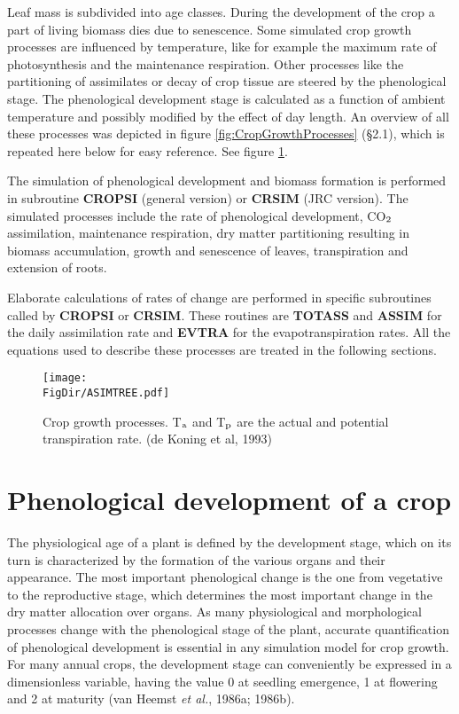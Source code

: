 Leaf mass is subdivided into age classes. During the development of the crop a part of
living biomass dies due to senescence. Some simulated crop growth processes are
influenced by temperature, like for example the maximum rate of photosynthesis and the
maintenance respiration. Other processes like the partitioning of assimilates or decay of
crop tissue are steered by the phenological stage. The phenological development stage is
calculated as a function of ambient temperature and possibly modified by the effect of day
length. An overview of all these processes was depicted in figure \ref{fig:CropGrowthProcesses} 
(\S 2.1), which is repeated here below for easy reference. See figure \ref{fig:CropGrowthProcesses2}.

The simulation of phenological development and biomass formation is performed in
subroutine {\bf CROPSI} (general version) or {\bf CRSIM} (JRC version). The simulated processes
include the rate of phenological development, CO$_{{\rm 2}}$ assimilation, maintenance respiration,
dry matter partitioning resulting in biomass accumulation, growth and senescence of
leaves, transpiration and extension of roots. 

Elaborate calculations of rates of change are performed in specific subroutines called by
{\bf CROPSI} or {\bf CRSIM}. These routines are {\bf TOTASS} and {\bf ASSIM} for the daily assimilation
rate and {\bf EVTRA} for the evapotranspiration rates. All the equations used to describe these
processes are treated in the following sections.

\begin{figure}[p]
\centering
\texttt{[image: \\FigDir/ASIMTREE.pdf]}
\caption{Crop growth processes. \small T$_{{\rm a}}$ and T$_{{\rm p}}$ are the actual and potential 
transpiration rate. (de Koning et al, 1993)}
\label{fig:CropGrowthProcesses2}
\end{figure}

\section{Phenological development of a crop}

The physiological age of a plant is defined by the development stage, which on its turn is
characterized by the formation of the various organs and their appearance. The most
important phenological change is the one from vegetative to the reproductive stage, which
determines the most important change in the dry matter allocation over organs. As many
physiological and morphological processes change with the phenological stage of the
plant, accurate quantification of phenological development is essential in any simulation
model for crop growth. For many annual crops, the development stage can conveniently
be expressed in a dimensionless variable, having the value 0 at seedling emergence, 1 at
flowering and 2 at maturity (van Heemst {\it et al.}, 1986a; 1986b). 

